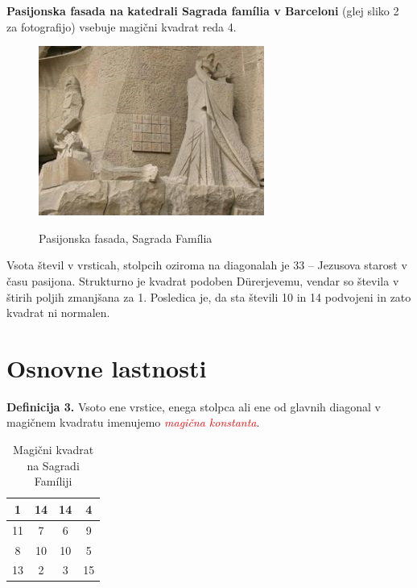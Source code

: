 \documentclass[a4paper,12pt]{article}
\begin{document}
\textbf{Pasijonska fasada na katedrali Sagrada família v Barceloni}
(glej sliko 2 za fotografijo) vsebuje magični kvadrat reda 4.


\begin{figure}[h]
   \centering
   \caption{Pasijonska fasada, Sagrada Família}
   \includegraphics[scale=0.5]{sagrada.png}
   \label{fig:sagrada}
\end{figure}

Vsota števil v vrsticah, stolpcih oziroma na diagonalah je 33 -- Jezusova starost
v času pasijona. Strukturno je kvadrat podoben Dürerjevemu, vendar so števila
v štirih poljih zmanjšana za 1. Posledica je, da sta števili 10 in 14 podvojeni
in zato kvadrat ni normalen.
%


\section{Osnovne lastnosti}

     \textbf{Definicija 3.} Vsoto ene vrstice, enega stolpca ali ene od glavnih diagonal
      v magičnem kvadratu imenujemo \textcolor{red}{\emph{magična konstanta}}.
\begin{table}[H]
   \centering
   \caption{Magični kvadrat na Sagradi Famíliji}
   \label{table:sagrada}
   \begin{tabular}{|c|c|c|c|}
   \hline
      1 & 14 & 14 &  4 \\\hline
     11 &  7 &  6 &  9 \\\hline
      8 & 10 & 10 &  5 \\\hline
     13 &  2 &  3 & 15 \\\hline
   \end{tabular}
   \end{table}
\end{document}
